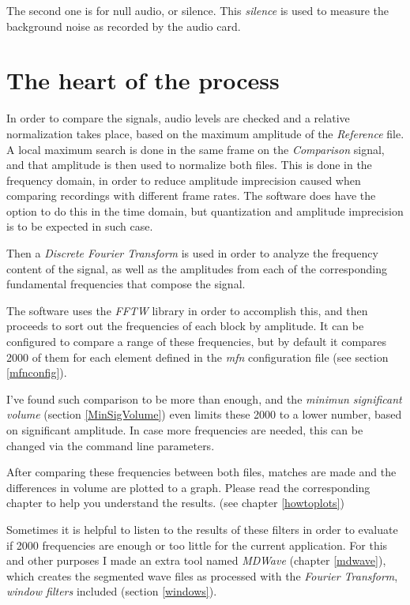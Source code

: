 \documentclass[10pt,a4paper]{report}
\begin{document}
The second one is for null audio, or silence. This \textit{silence} is used to measure the background noise as recorded by the audio card. 

\section{The heart of the process}

In order to compare the signals, audio levels are checked and a relative normalization takes place, based on the maximum amplitude of the \textit{Reference} file. A local maximum search is done in the same frame on the \textit{Comparison} signal, and that amplitude is then used to normalize both files. This is done in the frequency domain, in order to reduce amplitude imprecision caused when comparing recordings with different frame rates. The software does have the option to do this in the time domain, but quantization and amplitude imprecision is to be expected in such case.

Then a \textit{Discrete Fourier Transform}\cite{FourierTransformApps} is used in order to analyze the frequency content of the signal, as well as the amplitudes from each of the corresponding fundamental frequencies that compose the signal.

The software uses the \textit{FFTW}\cite{fftw} library in order to accomplish this, and then proceeds to sort out the frequencies of each block by amplitude. It can be configured to compare a range of these frequencies, but by default it compares 2000 of them for each element defined in the \textit{mfn} configuration file (see section \ref{mfnconfig}).

I've found such comparison to be more than enough, and the \textit{minimun significant volume} (section \ref{MinSigVolume}) even limits these 2000 to a lower number, based on significant amplitude. In case more frequencies are needed, this can be changed via the command line parameters.

After comparing these frequencies between both files, matches are made and the differences in volume are plotted to a graph. Please read the corresponding chapter to help you understand the results. (see chapter \ref{howtoplots})

Sometimes it is helpful to listen to the results of these filters in order to evaluate if 2000 frequencies are enough or too little for the current application. For this and other purposes I made an extra tool named \textit{MDWave} (chapter \ref{mdwave}), which creates the segmented wave files as processed with the \textit{Fourier Transform}, \textit{window filters} included (section \ref{windows}).
\end{document}
